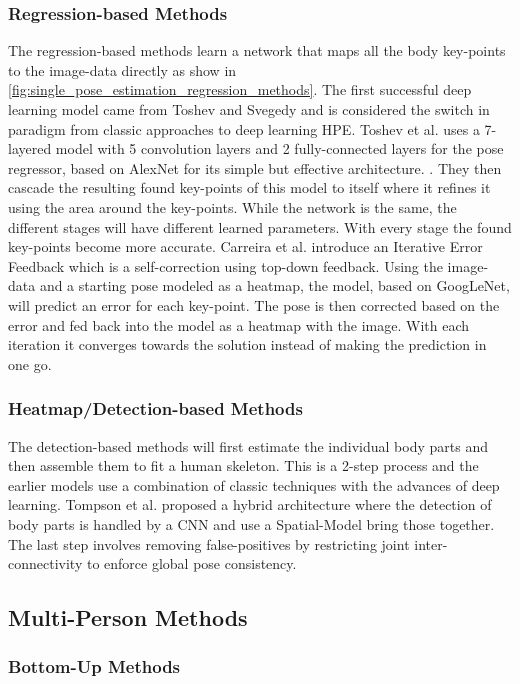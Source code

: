 \subsubsection{Regression-based Methods}
The regression-based methods learn a network that maps all the body key-points to the image-data directly as show in \ref{fig:single_pose_estimation_regression_methods}.
The first successful deep learning model came from Toshev and Svegedy\cite{Toshev2014} and is considered the switch in paradigm from classic approaches to deep learning \gls{HPE}.
Toshev et al. uses a 7-layered model with 5 convolution layers and 2 fully-connected layers for the pose regressor, based on AlexNet for its simple but effective architecture. \cite{AlexNet}.
They then cascade the resulting found key-points of this model to itself where it refines it using the area around the key-points.
While the network is the same, the different stages will have different learned parameters.
With every stage the found key-points become more accurate.
Carreira et al.\cite{CarreiraAFM15} introduce an Iterative Error Feedback which is a self-correction using top-down feedback.
Using the image-data and a starting pose modeled as a heatmap, the model, based on GoogLeNet\cite{googlenet}, will predict an error for each key-point.
The pose is then corrected based on the error and fed back into the model as a heatmap with the image.
With each iteration it converges towards the solution instead of making the prediction in one go.

\subsubsection{Heatmap/Detection-based Methods}
The detection-based methods will first estimate the individual body parts and then assemble them to fit a human skeleton.
This is a 2-step process and the earlier models use a combination of classic techniques with the advances of deep learning.
Tompson et al.\cite{TompsonJLB14} proposed a hybrid architecture where the detection of body parts is handled by a \gls{CNN} and use a Spatial-Model bring those together.
The last step involves removing false-positives by restricting joint inter-connectivity to enforce global pose consistency.


\subsection{Multi-Person Methods}


\subsubsection{Bottom-Up Methods}


